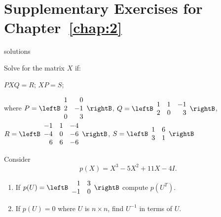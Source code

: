 \section*{Supplementary Exercises for Chapter~\ref{chap:2}}

\begin{Filesave}{solutions}
\end{Filesave}

\begin{multicols}{2}
\begin{supex}
Solve for the matrix $X$ if:
\begin{exenumerate}
\exitem $PXQ = R$;
\exitem $XP = S$;
\end{exenumerate}
where
$
P = \leftB \begin{array}{rr}
1 & 0 \\
2 & -1 \\
0 & 3
\end{array} \rightB$, $ 
Q = \leftB \begin{array}{rrr}
1 & 1 & -1 \\
2 & 0 & 3
\end{array} \rightB$, \\ $ 
R = \leftB \begin{array}{rrr}
-1 & 1 & -4 \\
-4 & 0 & -6 \\
6 & 6 & -6
\end{array} \rightB$, $ 
S = \leftB \begin{array}{rr}
1 & 6\\
3 & 1
\end{array} \rightB$
\end{supex}

\begin{supex}
Consider \begin{equation*}
p(X) = X^{3} - 5X^{2} + 11X - 4I.
\end{equation*}


\begin{enumerate}[label={\alph*.}]
\item If $p(U) = \leftB \begin{array}{rr}
1 & 3 \\
-1 & 0
\end{array} \rightB$
 compute $p(U^{T})$.

\item If $p(U) = 0$ where $U$ is $n \times n$, find $U^{-1}$ in terms of $U$.


\end{enumerate}
\end{supex}
\end{multicols}
